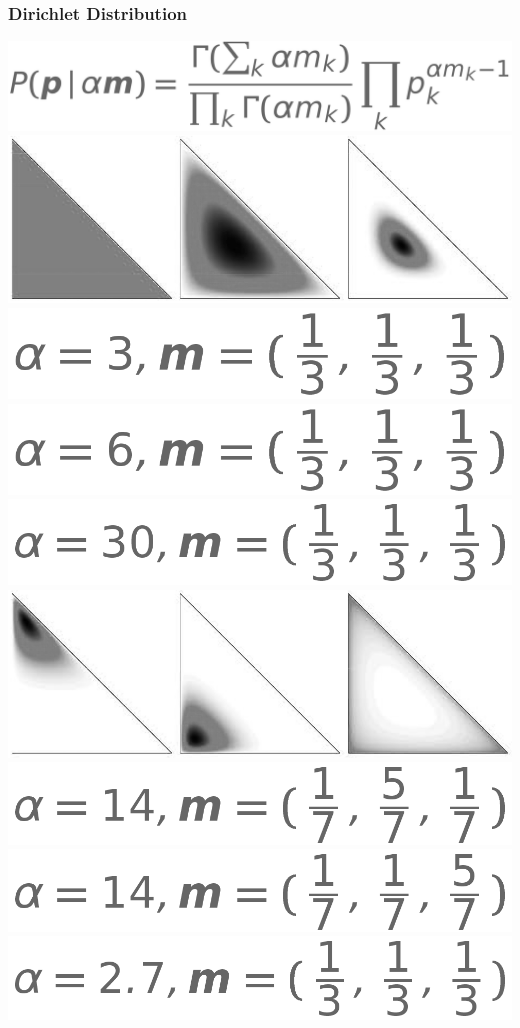 \begin{frame}

\frametitle{Dirichlet Distribution}

\begin{center}
\includegraphics[width=0.4\linewidth]{topic_models/equations/dirichlet} \\ \bigskip
\pause
\includegraphics[width=0.6\linewidth]{topic_models/dirichlet_1} \\
\includegraphics[width=0.2\linewidth]{topic_models/equations/dirichlet_params_1} \includegraphics[width=0.2\linewidth]{topic_models/equations/dirichlet_params_2} \includegraphics[width=0.2\linewidth]{topic_models/equations/dirichlet_params_3} \\
\pause
\includegraphics[width=0.6\linewidth]{topic_models/dirichlet_2} \\
\includegraphics[width=0.2\linewidth]{topic_models/equations/dirichlet_params_4} \includegraphics[width=0.2\linewidth]{topic_models/equations/dirichlet_params_5} \includegraphics[width=0.2\linewidth]{topic_models/equations/dirichlet_params_6} \\
\end{center}

\end{frame}

